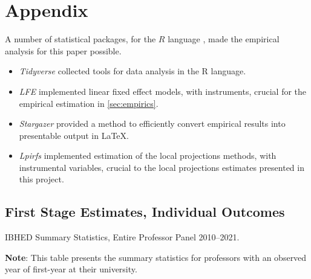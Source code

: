 \documentclass[notitlepage,12pt]{article}
\begin{document}




\appendix
\setcounter{table}{0}
\renewcommand{\thetable}{A\arabic{table}}
\setcounter{figure}{0}
\renewcommand{\thefigure}{A\arabic{figure}}

\section{Appendix}
\label{appendix}
A number of statistical packages, for the $R$ language \citep{R2022}, made the empirical analysis for this paper possible.
\begin{itemize}
    \item \textit{Tidyverse} \citep{tidyverse} collected tools for data analysis in the R language.
    \item \textit{LFE} \citep{lfe} implemented linear fixed effect models, with instruments, crucial for the empirical estimation in \autoref{sec:empirics}.
    \item \textit{Stargazer} \citep{stargazer} provided a method to efficiently convert empirical results into presentable output in \LaTeX.
    \item \textit{Lpirfs} \citep{lpirfs2019} implemented estimation of the \cite{jorda2005} local projections methods, with instrumental variables, crucial to the local projections estimates presented in this project.
\end{itemize}


\subsection{First Stage Estimates, Individual Outcomes}
\label{appendix:part1}

\begin{table}[h!]
    \singlespacing
    \centering
    \caption{IBHED Summary Statistics, Entire Professor Panel 2010--2021.}
    \makebox[\textwidth][c]{}
    \label{tab:illinois-summary-rolling}
    \begin{flushleft}
        \footnotesize
        \textbf{Note}: This table presents the summary statistics for professors with an observed year of first-year at their university.
    \end{flushleft}
\end{table}
\end{document}
